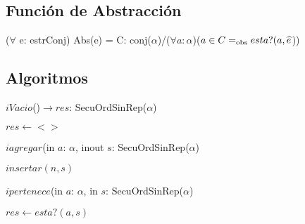 \subsection*{Funci\'on de Abstracci\'on}
\vspace{11pt}
($\forall$ e: estrConj) Abs(e) = C: conj($\alpha$)/($\forall a:\alpha$)($a\in C=_{\mathrm{obs}} esta?(a,\widehat{e}$))
\vspace{33pt}


\subsection*{Algoritmos}

$\textit{i}Vacio$()$\longrightarrow res$: SecuOrdSinRep($\alpha$)\\
\begin{algorithm}[H]
$res\leftarrow <>$
\end{algorithm}

$\textit{i}agregar$(in $a$: $\alpha$, inout $s$: SecuOrdSinRep($\alpha$)\\
\begin{algorithm}[H]
$insertar(n,s)$
\end{algorithm}

$ipertenece$(in $a$: $\alpha$, in $s$: SecuOrdSinRep($\alpha$)\\
\begin{algorithm}[H]
$res\leftarrow esta?(a,s)$
\end{algorithm}